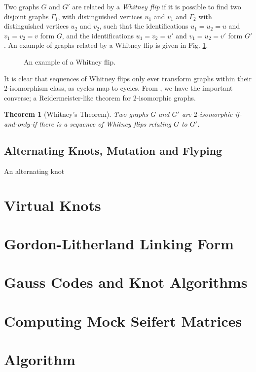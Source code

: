 \documentclass[12pt]{report}
\newtheorem*{theorem}{Theorem}
\begin{document}
Two graphs $G$ and $G'$ are related by a \textit{Whitney flip} if it is possible to find two disjoint graphs $\Gamma_{1}$, with distinguished vertices $u_{1}$ and $v_{1}$ and $\Gamma_{2}$ with distinguished vertices $u_{2}$ and $v_{2}$, such that the identifications $u_{1} = u_{2} = u$ and $v_{1} = v_{2} = v$ form $G$, and the identifications $u_{1} = v_{2} = u'$ and $v_{1} = u_{2} = v'$ form $G'$. An example of graphs related by a Whitney flip is given in Fig. \ref{fig:whitney_flip}.

\begin{figure}[hbt]
	\centering
	\def\svgscale{0.5}
	
	
	\caption{An example of a Whitney flip.}
	\label{fig:whitney_flip}
\end{figure}

It is clear that sequences of Whitney flips only ever transform graphs within their $2$-isomorphism class, as cycles map to cycles. From \cite{2-isomorphic-graphs}, we have the important converse; a Reidermeister-like theorem for $2$-isomorphic graphs.

\begin{theorem}[Whitney's Theorem]
Two graphs $G$ and $G'$ are $2$-isomorphic if-and-only-if there is a sequence of Whitney flips relating $G$ to $G'$.
\end{theorem}

\section{Alternating Knots, Mutation and Flyping}
An alternating knot

\chapter{Virtual Knots}

\chapter{Gordon-Litherland Linking Form}

\chapter{Gauss Codes and Knot Algorithms}


\chapter{Computing Mock Seifert Matrices}

\newpage
\printbibliography[title=References]


\appendix

\chapter{Algorithm}
\end{document}
